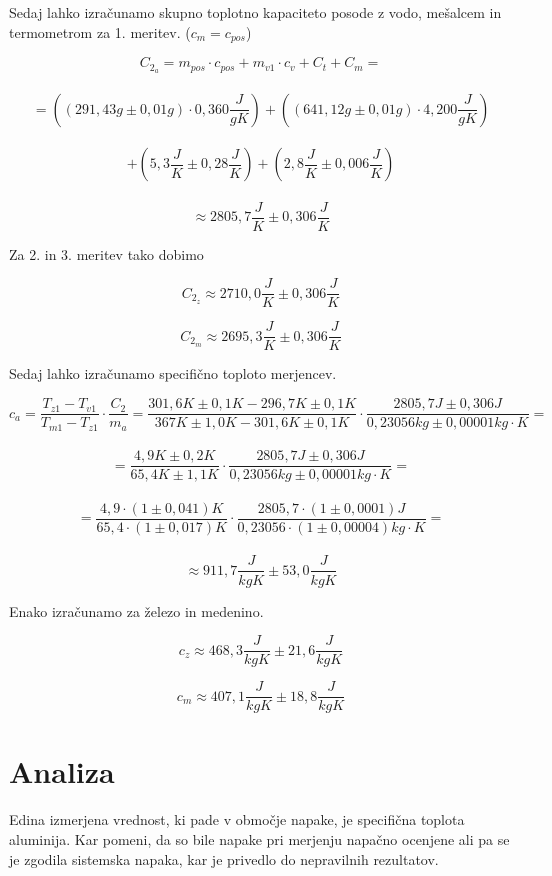 \documentclass[a4paper]{article}
\begin{document}
Sedaj lahko izračunamo skupno toplotno kapaciteto posode z vodo, mešalcem in termometrom za 1. meritev. ($c_m=c_{pos}$)

\[C_{2_a}=m_{pos}\cdot c_{pos}+m_{v1}\cdot c_v+C_t+C_m=\] \\
\[=\left((291,43g\pm0,01g)\cdot 0,360 \frac{J}{gK}\right)+\left((641,12g\pm0,01g)\cdot4,200\frac{J}{gK}\right)\]\\
\[+\left(5,3\frac{J}{K}\pm0,28\frac{J}{K}\right)+\left(2,8\frac{J}{K}\pm0,006\frac{J}{K}\right)\]\\
\[\approx2805,7\frac{J}{K}\pm0,306\frac{J}{K}\]

Za 2. in 3. meritev tako dobimo

\[C_{2_z}\approx2710,0\frac{J}{K}\pm0,306\frac{J}{K}\]

\[C_{2_m}\approx2695,3\frac{J}{K}\pm0,306\frac{J}{K}\]
\pagebreak

Sedaj lahko izračunamo specifično toploto merjencev.

\[c_a=\frac{T_{z1}-T_{v1}}{T_{m1}-T_{z1}}\cdot\frac{C_2}{m_a}=\frac{301,6K\pm0,1K-296,7K\pm0,1K}{367K\pm1,0K-301,6K\pm0,1K}\cdot\frac{2805,7J\pm0,306J}{0,23056kg\pm0,00001kg\cdot K}=\]\\
\[=\frac{4,9K\pm0,2K}{65,4K\pm1,1K}\cdot\frac{2805,7J\pm0,306J}{0,23056kg\pm0,00001kg\cdot K}=\]\\
\[=\frac{4,9\cdot(1\pm0,041)K}{65,4\cdot(1\pm0,017)K}\cdot\frac{2805,7\cdot(1\pm0,0001)J}{0,23056\cdot(1\pm0,00004)kg\cdot K}=\]\\
\[\approx 911,7\frac{J}{kgK}\pm53,0\frac{J}{kgK}\]

Enako izračunamo za železo in medenino.

\[c_z\approx 468,3\frac{J}{kgK}\pm21,6\frac{J}{kgK}\]

\[c_m\approx 407,1\frac{J}{kgK}\pm18,8\frac{J}{kgK}\]

\section{Analiza}
Edina izmerjena vrednost, ki pade v območje napake, je specifična toplota aluminija. Kar pomeni, da so bile napake pri merjenju napačno ocenjene ali pa se je zgodila sistemska napaka, kar je privedlo do nepravilnih rezultatov.
\end{document}
